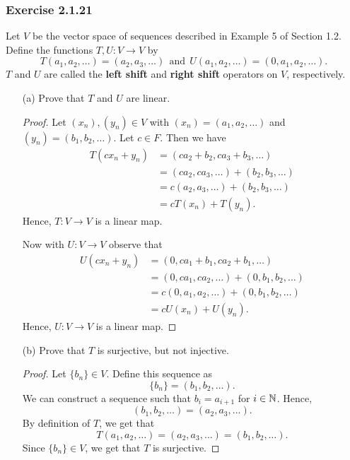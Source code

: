\subsubsection{Exercise 2.1.21} Let \( V  \) be the vector space of sequences described in Example 5 of Section 1.2. Define the functions \( T,U : V \to V  \) by 
\[  T(a_{1}, a_{2}, \dots ) = (a_{2}, a_{3}, \dots ) \ \  \text{and} \ \ U(a_{1}, a_{2}, \dots ) = (0, a_{1}, a_{2}, \dots).  \]
\( T \) and \( U  \) are called the \textbf{left shift} and \textbf{right shift} operators on \( V  \), respectively. 
\begin{enumerate}
    \item[(a)] Prove that \( T  \) and \( U  \) are linear.
        \begin{proof}
        Let \( (x_{n}), (y_{n}) \in V  \) with \( (x_{n}) = (a_{1}, a_{2}, \dots ) \) and \( (y_{n}) = (b_{1}, b_{2}, \dots ) \). Let \( c \in F  \). Then we have 
        \begin{align*}
            T(cx_{n} + y_{n}) &= (ca_{2} + b_{2}, ca_{3} + b_{3}, \dots ) \\
                              &= (ca_{2}, ca_{3}, \dots ) + (b_{2},  b_{3}, \dots ) \\
                              &= c(a_{2}, a_{3}, \dots ) + (b_{2}, b_{3}, \dots) \\
                              &= c T(x_{n}) + T(y_{n}).
        \end{align*}
        Hence, \( T: V \to V   \) is a linear map.

        Now with \( U: V \to V  \) observe that
        \begin{align*}
            U(cx_{n} + y_{n}) &= (0, ca_{1} + b_{1}, ca_{2} + b_{1}, \dots ) \\
                              &= (0, ca_{1}, ca_{2}, \dots) + (0, b_{1}, b_{2}, \dots) \\
                              &= c(0, a_{1}, a_{2}, \dots ) + (0, b_{1}, b_{2}, \dots ) \\ 
                              &= c U(x_{n}) + U(y_{n}).
        \end{align*}
        Hence, \( U: V \to V   \) is a linear map.
        \end{proof}
    \item[(b)] Prove that \( T \) is surjective, but not injective.
        \begin{proof}
        Let \( \{ b_{n} \}  \in V  \). Define this sequence as 
        \[  \{ b_{n} \}  =  (b_{1}, b_{2}, \dots ). \]
        We can construct a sequence such that \( b_{i} = a_{i+1}  \) for \( i \in \mathbb{N} \). Hence, 
        \[  (b_{1}, b_{2}, \dots)  = (a_{2}, a_{3}, \dots ).\]
        By definition of \( T  \), we get that
        \[  T(a_{1}, a_{2}, \dots ) = (a_{2}, a_{3}, \dots) = (b_{1}, b_{2}, \dots). \]
        Since \( \{ b_{n} \} \in V  \), we get that \( T  \) is surjective. 


\end{proof}
\end{enumerate}
